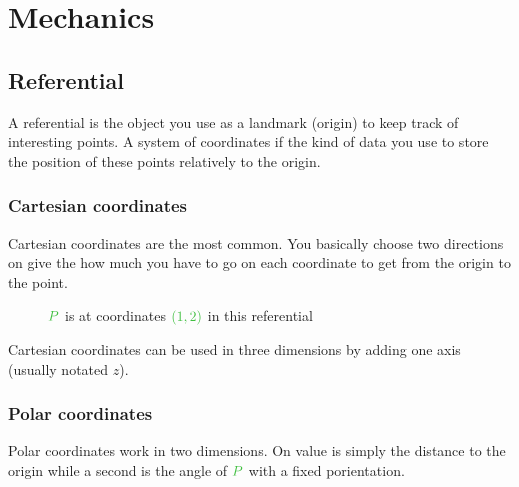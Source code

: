 \chapter{Mechanics}
\banner
{}



\section{Referential}

A referential is the object you use as a landmark (origin) to keep track
of interesting points. A system of coordinates if the kind of data you
use to store the position of these points relatively to the origin.


\subsection{Cartesian coordinates}

Cartesian coordinates are the most common. You basically choose two
directions on give the how much you have to go on each coordinate to
get from the origin to the point.

\begin{figure}[H]
\centering
{}
\caption{$\posit{P}$ is at coordinates $\posit{(1,2)}$ in this referential}
\end{figure}

Cartesian coordinates can be used in three dimensions by adding one axis
(usually notated $z$).


\subsection{Polar coordinates}

Polar coordinates work in two dimensions. On value is simply the distance
to the origin while a second is the angle of $\posit{P}$ with a fixed
porientation.

